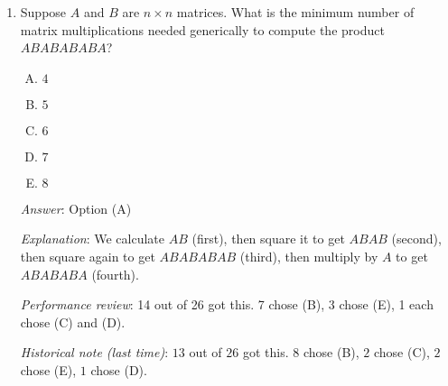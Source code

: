 \documentclass[10pt]{amsart}
\begin{document}
\begin{enumerate}
  {\em Answer}: Option (D)

  {\em Explanation}: Strassen's algorithm for the $2 \times 2$ case
  requires $7$ multiplications and $14$ additions. The number of
  additions is more. The saving on multiplication does dominate for
  large enough matrix sizes, but this does not occur immediately.

  Strassen's algorithm is definitely more complicated to code. If it
  were easy to code, it would also be easier to explain, and we would
  have discussed it in class.

  Parallelization is harder because on the ``conquer'' part of the
  divide and conquer strategy. With the naive approach, each entry can
  be computed totally separately. With Strassen's, there are many
  different types of computations that need to be done and then pieced
  together.

  {\em Performance review}: 18 out of 26 got this. 5 chose (C), 3
  chose (A).

  {\em Historical note (last time)}: $20$ out of $26$ got this. $3$ chose (C),
  $2$ chose (E), $1$ chose (A).
  \vspace{1in}

  There exist even faster algorithms for matrix multiplication than
  Strassen's algorithm. The best known algorithm currently is the {\em
    Coppersmith-Winograd algorithm}, which can multiply two $n \times
  n$ matrices in time $O(n^{2.3727})$. However, the
  Coppersmith-Winograd algorithm is even more rarely implemented than
  Strassen's for practical matrix multiplication code (according to
  some sources, Coppersmith-Winograd has {\em never} been
  implemented). The same reasons as those cited above for the
  reluctance to use Strassen's algorithm apply. There are some
  additional obstacles to practical implementations of the
  Coppersmith-Winograd algorithm that make it even more difficult to
  use.

  \vspace{1in}
\item Suppose $A$ and $B$ are $n \times n$ matrices. What is the
  minimum number of matrix multiplications needed generically to
  compute the product $ABABABABA$?

   \begin{enumerate}[(A)]
   \item $4$
   \item $5$
   \item $6$
   \item $7$
   \item $8$
   \end{enumerate}

   {\em Answer}: Option (A)

   {\em Explanation}: We calculate $AB$ (first), then square it to get
   $ABAB$ (second), then square again to get $ABABABAB$ (third), then
   multiply by $A$ to get $ABABABA$ (fourth).
   
   {\em Performance review}: 14 out of 26 got this. 7 chose (B), 3
   chose (E), 1 each chose (C) and (D).

   {\em Historical note (last time)}: $13$ out of $26$ got this. $8$ chose (B),
   $2$ chose (C), $2$ chose (E), $1$ chose (D).
\end{enumerate}
\end{document}
